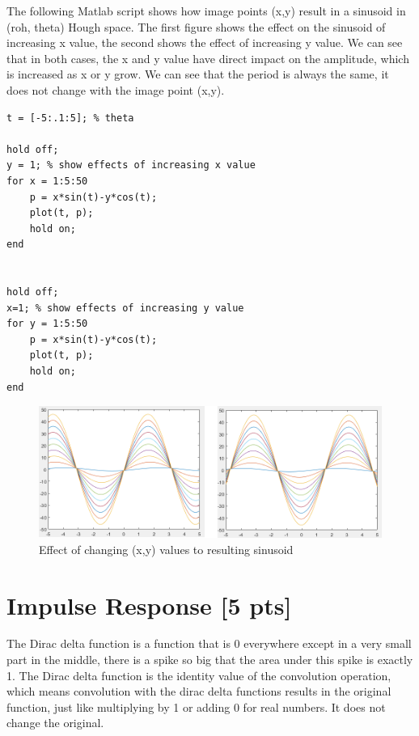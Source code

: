 \documentclass[12pt,a4paper]{article}
\begin{document}
The following Matlab script shows how image points (x,y) result in a sinusoid in (roh, theta) Hough space. The first figure shows the effect on the sinusoid of increasing x value, the second shows the effect of increasing y value.
We can see that in both cases, the x and y value have direct impact on the amplitude, which is increased as x or y grow.
We can see that the period is always the same, it does not change with the image point (x,y).

\begin{lstlisting}
t = [-5:.1:5]; % theta

hold off;
y = 1; % show effects of increasing x value
for x = 1:5:50
    p = x*sin(t)-y*cos(t);
    plot(t, p);
    hold on;
end


hold off;
x=1; % show effects of increasing y value
for y = 1:5:50
    p = x*sin(t)-y*cos(t);
    plot(t, p);
    hold on;
end
\end{lstlisting}


\begin{figure}[!h]
    \begin{center}
        \includegraphics[width=1.0\textwidth]{assets/ht.png}
        \caption{Effect of changing (x,y) values to resulting sinusoid}
        \label{fig:hough_transform}
    \end{center}
\end{figure}


\section{Impulse Response [5 pts]}
The Dirac delta function is a function that is 0 everywhere except in a very small part in the middle, there is a spike so big that the area under this spike is exactly 1.
The Dirac delta function is the identity value of the convolution operation, which means convolution with the dirac delta functions results in the original function, just like multiplying by 1 or adding 0 for real numbers. It does not change the original.
\end{document}
